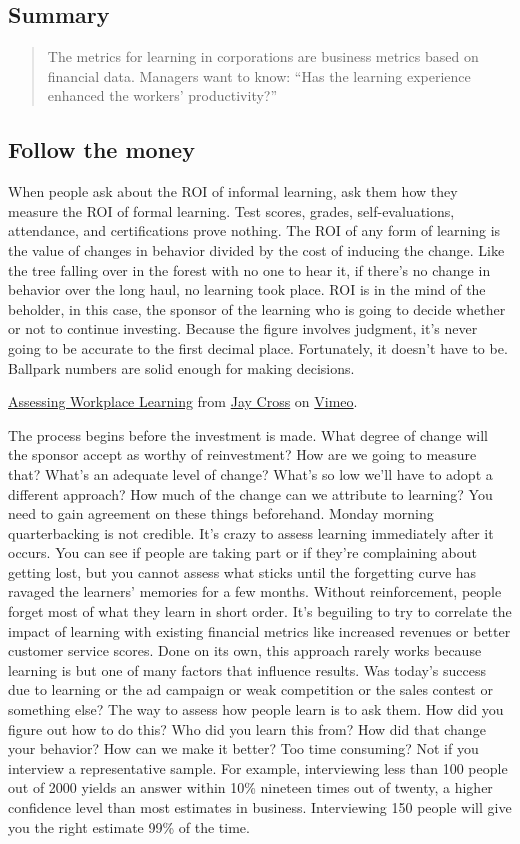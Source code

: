 \subsection{Summary}

\begin{quote}
The metrics for learning in corporations are business metrics based on
financial data. Managers want to know: ``Has the learning experience
enhanced the workers' productivity?''
\end{quote}
\subsection{Follow the money}

When people ask about the ROI of informal learning, ask them how they
measure the ROI of formal learning. Test scores, grades,
self-evaluations, attendance, and certifications prove nothing. The ROI
of any form of learning is the value of changes in behavior divided by
the cost of inducing the change. Like the tree falling over in the
forest with no one to hear it, if there's no change in behavior over the
long haul, no learning took place. ROI is in the mind of the beholder,
in this case, the sponsor of the learning who is going to decide whether
or not to continue investing. Because the figure involves judgment, it's
never going to be accurate to the first decimal place. Fortunately, it
doesn't have to be. Ballpark numbers are solid enough for making
decisions.

\href{http://vimeo.com/45989089}{Assessing Workplace Learning} from
\href{http://vimeo.com/user7021511}{Jay Cross} on
\href{http://vimeo.com}{Vimeo}.

The process begins before the investment is made. What degree of change
will the sponsor accept as worthy of reinvestment? How are we going to
measure that? What's an adequate level of change? What's so low we'll
have to adopt a different approach? How much of the change can we
attribute to learning? You need to gain agreement on these things
beforehand. Monday morning quarterbacking is not credible. It's crazy to
assess learning immediately after it occurs. You can see if people are
taking part or if they're complaining about getting lost, but you cannot
assess what sticks until the forgetting curve has ravaged the learners'
memories for a few months. Without reinforcement, people forget most of
what they learn in short order. It's beguiling to try to correlate the
impact of learning with existing financial metrics like increased
revenues or better customer service scores. Done on its own, this
approach rarely works because learning is but one of many factors that
influence results. Was today's success due to learning or the ad
campaign or weak competition or the sales contest or something else? The
way to assess how people learn is to ask them. How did you figure out
how to do this? Who did you learn this from? How did that change your
behavior? How can we make it better? Too time consuming? Not if you
interview a representative sample. For example, interviewing less than
100 people out of 2000 yields an answer within 10\% nineteen times out
of twenty, a higher confidence level than most estimates in business.
Interviewing 150 people will give you the right estimate 99\% of the
time.
